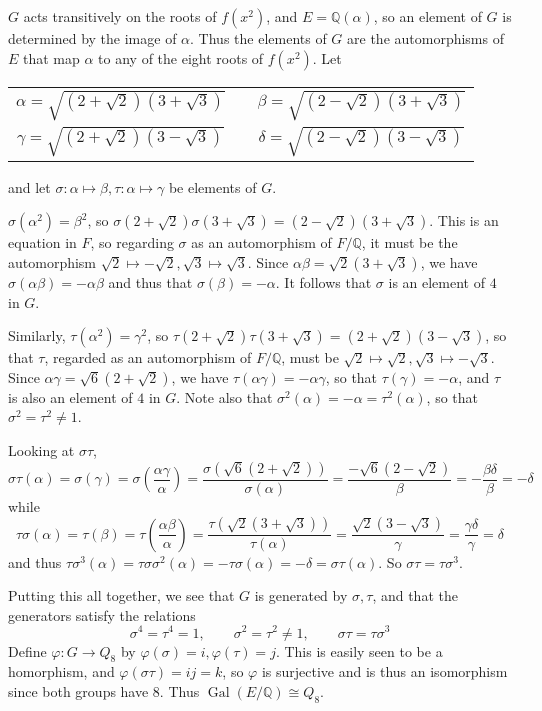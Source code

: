 \documentclass[12pt]{article}
\newcommand{\Rats}{\mathbb{Q}}
\newcommand{\Gal}{\operatorname{Gal}}
\renewcommand{\a}{(2+\sqrt{2})(3+\sqrt{3})}
\renewcommand{\b}{(2-\sqrt{2})(3+\sqrt{3})}
\renewcommand{\c}{(2+\sqrt{2})(3-\sqrt{3})}
\renewcommand{\d}{(2-\sqrt{2})(3-\sqrt{3})}
\newcommand{\sa}{\sqrt{\a}}
\renewcommand{\sb}{\sqrt{\b}}
\renewcommand{\sc}{\sqrt{\c}}
\newcommand{\sd}{\sqrt{\d}}
\begin{document}
$G$ acts transitively on the roots of $f(x^2)$, and $E=\Rats(\alpha)$, so an element of $G$ is determined by the image of $\alpha$. Thus the elements of $G$ are the automorphisms of $E$ that map $\alpha$ to any of the eight roots of $f(x^2)$. Let
\begin{center}\begin{tabular}{ccc}
$\alpha=\sa$ & \qquad & $\beta = \sb$\\
$\gamma=\sc$ & \qquad & $\delta=\sd$
\end{tabular}\end{center}
and let $\sigma:\alpha\mapsto\beta, \tau:\alpha\mapsto\gamma$ be elements of $G$.

$\sigma(\alpha^2)=\beta^2$, so $\sigma(2+\sqrt{2})\sigma(3+\sqrt{3})=(2-\sqrt{2})(3+\sqrt{3})$. This is an equation in $F$, so regarding $\sigma$ as an automorphism of $F/\Rats$, it must be the automorphism $\sqrt{2}\mapsto -\sqrt{2}, \sqrt{3}\mapsto \sqrt{3}$. Since $\alpha\beta=\sqrt{2}(3+\sqrt{3})$, we have $\sigma(\alpha\beta)=-\alpha\beta$ and thus that $\sigma(\beta)=-\alpha$. It follows that $\sigma$ is an element of  $4$ in $G$.

Similarly, $\tau(\alpha^2)=\gamma^2$, so $\tau(2+\sqrt{2})\tau(3+\sqrt{3})=(2+\sqrt{2})(3-\sqrt{3})$, so that $\tau$, regarded as an automorphism of $F/\Rats$, must be $\sqrt{2}\mapsto\sqrt{2}, \sqrt{3}\mapsto -\sqrt{3}$. Since $\alpha\gamma=\sqrt{6}(2+\sqrt{2})$, we have $\tau(\alpha\gamma)=-\alpha\gamma$, so that $\tau(\gamma)=-\alpha$, and $\tau$ is also an element of  $4$ in $G$. Note also that $\sigma^2(\alpha)=-\alpha=\tau^2(\alpha)$, so that $\sigma^2=\tau^2\neq 1$.

Looking at $\sigma\tau$, 
\[\sigma\tau(\alpha)=\sigma(\gamma)=\sigma\left(\frac{\alpha\gamma}{\alpha}\right)=
\frac{\sigma(\sqrt{6}(2+\sqrt{2}))}{\sigma(\alpha)}=\frac{-\sqrt{6}(2-\sqrt{2})}{\beta}=
-\frac{\beta\delta}{\beta}=-\delta\]
while
\[\tau\sigma(\alpha)=\tau(\beta)=\tau\left(\frac{\alpha\beta}{\alpha}\right)=
\frac{\tau(\sqrt{2}(3+\sqrt{3}))}{\tau(\alpha)}=\frac{\sqrt{2}(3-\sqrt{3})}{\gamma}=
\frac{\gamma\delta}{\gamma}=\delta\]
and thus $\tau\sigma^3(\alpha)=\tau\sigma\sigma^2(\alpha)=-\tau\sigma(\alpha)=-\delta=\sigma\tau(\alpha)$. So $\sigma\tau=\tau\sigma^3$.

Putting this all together, we see that $G$ is generated by $\sigma, \tau$, and that the generators satisfy the relations
\[\sigma^4=\tau^4=1,\qquad \sigma^2=\tau^2\neq 1,\qquad \sigma\tau=\tau\sigma^3\]
Define $\varphi:G\to Q_8$ by $\varphi(\sigma)=i, \varphi(\tau)=j$. This is easily seen to be a homorphism, and $\varphi(\sigma\tau)=ij=k$, so $\varphi$ is surjective and is thus an isomorphism since both groups have  $8$. Thus $\Gal(E/\Rats)\cong Q_8$.
\end{document}

